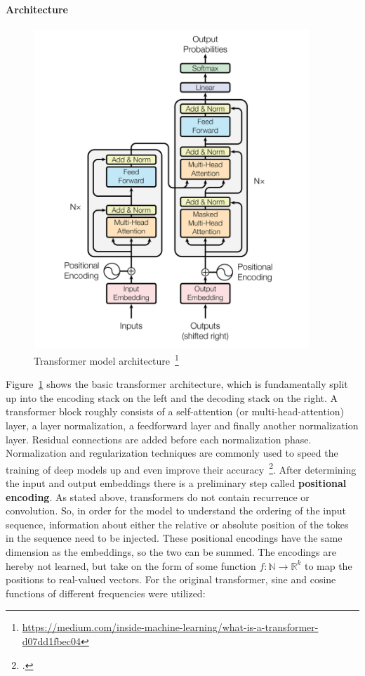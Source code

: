 \paragraph{Architecture}
\begin{figure}[h]
  	\includegraphics[height=12cm]{img/transformer}
  	\caption[Transformer model architecture]{Transformer model architecture~\footnote{\url{https://medium.com/inside-machine-learning/what-is-a-transformer-d07dd1fbec04}}}
	\label{fig:transformer}
\end{figure}
Figure~\ref{fig:transformer} shows the basic transformer architecture, which is fundamentally split up into the encoding stack on the left and the decoding stack on the right. A transformer block roughly consists of a self-attention (or multi-head-attention) layer, a layer normalization, a feedforward layer and finally another normalization layer. Residual connections are added before each normalization phase. Normalization and regularization techniques are commonly used to speed the training of deep models up and even improve their accuracy~\footcite{DBLP:journals/corr/abs-1903-00925}. After determining the input and output embeddings there is a preliminary step called \textbf{positional encoding}. As stated above, transformers do not contain recurrence or convolution. So, in order for the model to understand the ordering of the input sequence, information about either the relative or absolute position of the tokes in the sequence need to be injected. These positional encodings have the same dimension as the embeddings, so the two can be summed. The encodings are hereby not learned, but take on the form of some function $ f: \mathbb{N} \rightarrow \mathbb{R}^k $ to map the positions to real-valued vectors. For the original transformer, sine and cosine functions of different frequencies were utilized:
